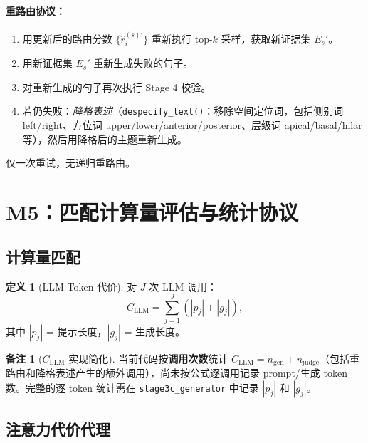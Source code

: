 \documentclass[11pt,a4paper]{article}
\theoremstyle{definition}
\newtheorem{definition}{定义}[section]
\newtheorem{remark}{备注}[section]
\begin{document}
\paragraph{重路由协议：}
\begin{enumerate}
    \item 用更新后的路由分数 $\{\hat{r}_i^{(s)\prime}\}$ 重新执行 top-$k$ 采样，获取新证据集 $E_s'$。
    \item 用新证据集 $E_s'$ 重新生成失败的句子。
    \item 对重新生成的句子再次执行 Stage 4 校验。
    \item 若仍失败：\emph{降格表述}（\texttt{despecify\_text()}：移除空间定位词，包括侧别词 left/right、方位词 upper/lower/anterior/posterior、层级词 apical/basal/hilar 等），然后用降格后的主题重新生成。
\end{enumerate}
仅一次重试，无递归重路由。


\section{M5：匹配计算量评估与统计协议}


\subsection{计算量匹配}

\begin{definition}[LLM Token 代价]
对 $J$ 次 LLM 调用：
\begin{equation}\label{eq:cllm}
C_{\mathrm{LLM}} = \sum_{j=1}^{J} (|p_j| + |g_j|),
\end{equation}
其中 $|p_j|$ = 提示长度，$|g_j|$ = 生成长度。
\end{definition}

\begin{remark}[$C_{\mathrm{LLM}}$ 实现简化]
当前代码按\textbf{调用次数}统计 $C_{\mathrm{LLM}} = n_{\mathrm{gen}} + n_{\mathrm{judge}}$（包括重路由和降格表述产生的额外调用），尚未按公式逐调用记录 prompt/生成 token 数。完整的逐 token 统计需在 \texttt{stage3c\_generator} 中记录 $|p_j|$ 和 $|g_j|$。
\end{remark}

\subsection{注意力代价代理}
\end{document}
